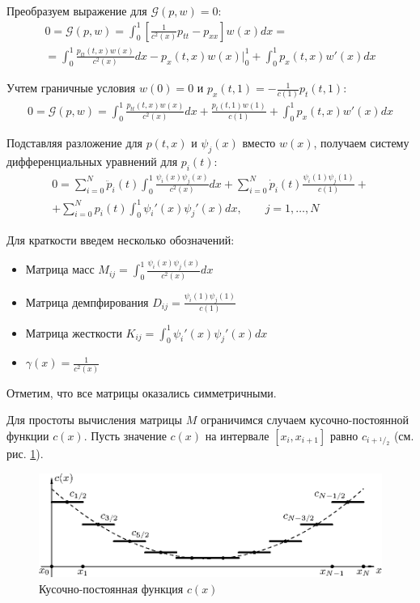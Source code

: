\documentclass[12pt]{article}
\newcommand{\cutefrac}[2]{{}^{#1\!}\!/{\!}_#2}
\newcommand{\half}{\cutefrac{1}{2}}
\begin{document}
Преобразуем выражение для $\mathcal{G}(p, w) = 0$:
\begin{gather*}
0 = \mathcal{G}(p, w) 
= \int_0^1 \left[\frac{1}{c^2(x)} p_{tt} - p_{xx}\right] w(x) dx = \\
= 
\int_0^1 \frac{p_{tt}(t, x) w(x)}{c^2(x)} dx
-p_{x}(t, x) w(x)\Big|_0^1
+\int_0^1 p_{x}(t, x) w'(x) dx
\end{gather*}

Учтем граничные условия $w(0) = 0$ и $p_x(t, 1) =
-\displaystyle\frac{1}{c(1)}p_t(t, 1)$:
\begin{gather*}
0 = \mathcal{G}(p, w)
= 
\int_0^1 \frac{p_{tt}(t, x) w(x)}{c^2(x)} dx
+\frac{p_{t}(t, 1) w(1)}{c(1)}
+\int_0^1 p_{x}(t, x) w'(x) dx
\end{gather*}

Подставляя разложение для $p(t, x)$ и $\psi_j(x)$ вместо $w(x)$, получаем систему
дифференциальных уравнений для $p_i(t)$:
\begin{multline}
0 = \sum_{i=0}^N \ddot p_i(t) \int_0^1 \frac{\psi_i(x) \psi_j(x)}{c^2(x)} dx 
+ \sum_{i=0}^N \dot p_i(t) \frac{\psi_i(1) \psi_j(1)}{c(1)} + {}\\
+ \sum_{i=0}^N p_i(t) \int_0^1 \psi_i'(x) \psi_j'(x) dx, \qquad j = 1, \dots,
N\qquad
\label{eq:ode}
\end{multline}

Для краткости введем несколько обозначений:
\begin{itemize}
\item Матрица масс $M_{ij} = \displaystyle\int_0^1 \frac{\psi_i(x)\psi_j(x)}{c^2(x)} dx$
\item Матрица демпфирования $D_{ij} =
\displaystyle\frac{\psi_i(1)\psi_j(1)}{c(1)}$
\item Матрица жесткости $K_{ij} = \displaystyle\int_0^1 \psi_i'(x)\psi_j'(x) dx$
\item $\gamma(x) = \frac{1}{c^2(x)}$
\end{itemize}

Отметим, что все матрицы оказались симметричными.

Для простоты вычисления матрицы $M$ ограничимся случаем кусочно-постоянной
функции $c(x)$. Пусть значение $c(x)$ на интервале $[x_i, x_{i+1}]$ равно 
$c_{i+\half}$ (см. рис. \ref{pic:3}).

\begin{figure}[!ht]
\centering
\includegraphics[width=.8\textwidth]{func-2.eps}
\caption{Кусочно-постоянная функция $c(x)$}
\label{pic:3}
\end{figure}
\end{document}
